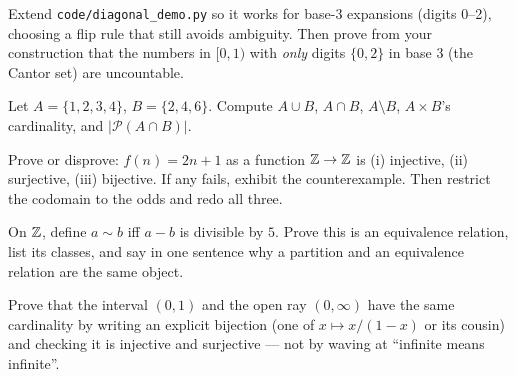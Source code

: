 \begin{exercise}[hard]
Extend \texttt{code/diagonal\_demo.py} so it works for base-3 expansions
(digits 0--2), choosing a flip rule that still avoids ambiguity. Then prove
from your construction that the numbers in $[0,1)$ with \emph{only} digits
$\{0,2\}$ in base 3 (the Cantor set) are uncountable.
\end{exercise}
\begin{exercise}[easy]
Let $A = \{1,2,3,4\}$, $B = \{2,4,6\}$. Compute $A\cup B$, $A\cap B$,
$A\setminus B$, $A\times B$'s cardinality, and $|\mathcal{P}(A\cap B)|$.
\end{exercise}
\begin{exercise}[medium]
Prove or disprove: $f(n) = 2n+1$ as a function $\mathbb{Z}\to\mathbb{Z}$ is (i) injective,
(ii) surjective, (iii) bijective. If any fails, exhibit the counterexample.
Then restrict the codomain to the odds and redo all three.
\end{exercise}
\begin{exercise}[medium]
On $\mathbb{Z}$, define $a \sim b$ iff $a - b$ is divisible by $5$. Prove this is an
equivalence relation, list its classes, and say in one sentence why a
partition and an equivalence relation are the same object.
\end{exercise}
\begin{exercise}[hard]
Prove that the interval $(0,1)$ and the open ray $(0,\infty)$ have the same
cardinality by writing an explicit bijection (one of $x \mapsto x/(1-x)$ or
its cousin) and checking it is injective and surjective --- not by waving at
``infinite means infinite''.
\end{exercise}

